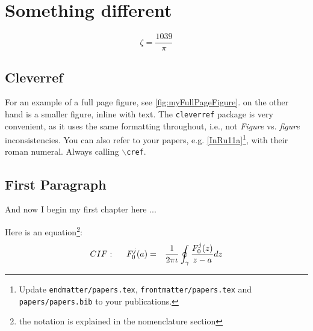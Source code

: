 
\chapter{Something different }

 \lipsum[1]
\begin{equation}
    \zeta = \frac{1039}{\pi}
\end{equation}

\section{Cleverref}
For an example of a full page figure, see \cref{fig:myFullPageFigure}. 
 on the other hand is a smaller figure, inline with text. 
The \texttt{cleverref} package is very convenient, as it uses the same 
formatting throughout, i.e., not \emph{Figure} vs. \emph{figure} 
inconsistencies. You can also refer to your papers, e.g. 
\cref{InRu11a}\footnote{Update \texttt{endmatter/papers.tex},
    \texttt{frontmatter/papers.tex} and \texttt{papers/papers.bib} to your 
    publications.},  
with their roman numeral. Always calling \texttt{$\backslash$cref}.

\lipsum[3]

\section{First Paragraph}
And now I begin my first chapter here ...

Here is an equation\footnote{the notation is explained in the nomenclature 
section}:
\begin{eqnarray}
	CIF: \hspace*{5mm}F_0^j(a) &=& \frac{1}{2\pi \iota} \oint_{\gamma} \frac{F_0^j(z)}{z - a} dz
\end{eqnarray}

\lipsum[4-6]
\lipsum[4-6]

